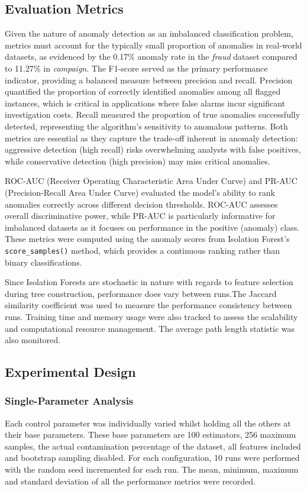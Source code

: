 \documentclass[10pt, conference]{IEEEtran}
\begin{document}
\subsection{Evaluation Metrics}
Given the nature of anomaly detection as an imbalanced classification problem, metrics must account for the typically small proportion of anomalies in real-world datasets, as evidenced by the 0.17\% anomaly rate in the \textit{fraud} dataset compared to 11.27\% in \textit{campaign}. The F1-score served as the primary performance indicator, providing a balanced measure between precision and recall. Precision quantified the proportion of correctly identified anomalies among all flagged instances, which is critical in applications where false alarms incur significant investigation costs. Recall measured the proportion of true anomalies successfully detected, representing the algorithm's sensitivity to anomalous patterns. Both metrics are essential as they capture the trade-off inherent in anomaly detection: aggressive detection (high recall) risks overwhelming analysts with false positives, while conservative detection (high precision) may miss critical anomalies.

ROC-AUC (Receiver Operating Characteristic Area Under Curve) and PR-AUC (Precision-Recall Area Under Curve) evaluated the model's ability to rank anomalies correctly across different decision thresholds. ROC-AUC assesses overall discriminative power, while PR-AUC is particularly informative for imbalanced datasets as it focuses on performance in the positive (anomaly) class. These metrics were computed using the anomaly scores from Isolation Forest's \texttt{score\_samples()} method, which provides a continuous ranking rather than binary classifications.

Since Isolation Forests are stochastic in nature with regards to feature selection during tree construction, performance does vary between runs.The Jaccard similarity coefficient was used to measure the performance consistency between runs. Training time and memory usage were also tracked to assess the scalability and computational resource management. The average path length statistic was also monitored.
\subsection{Experimental Design}
\subsubsection{Single-Parameter Analysis}
Each control parameter was individually varied whilst holding all the others at their base parameters. These base parameters are 100 estimators, 256 maximum samples, the actual contamination percentage of the dataset, all features included and bootstrap sampling disabled. For each configuration, 10 runs were performed with the random seed incremented for each run. The mean, minimum, maximum and standard deviation of all the performance metrics were recorded.
\end{document}
